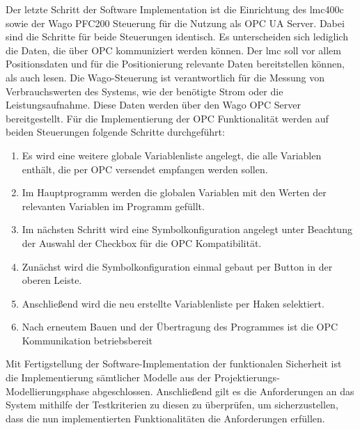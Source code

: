 \documentclass[../../../Bachelorarbeit.tex]{subfiles}
\begin{document}
Der letzte Schritt der Software Implementation ist die Einrichtung des \acs{lmc}400c sowie der Wago PFC200 Steuerung für die Nutzung als OPC UA Server. Dabei sind die Schritte für beide Steuerungen identisch. Es unterscheiden sich lediglich die Daten, die über OPC kommuniziert werden können. Der \acs{lmc} soll vor allem Positionsdaten und für die Positionierung relevante Daten bereitstellen können, als auch lesen. Die Wago-Steuerung ist verantwortlich für die Messung von Verbrauchswerten des Systems, wie der benötigte Strom oder die Leistungsaufnahme. Diese Daten werden über den Wago OPC Server bereitgestellt. Für die Implementierung der OPC Funktionalität werden auf beiden Steuerungen folgende Schritte durchgeführt:

\begin{enumerate}
    \item Es wird eine weitere globale Variablenliste angelegt, die alle Variablen enthält, die per OPC versendet \bzw empfangen werden sollen.
    \item Im Hauptprogramm werden die globalen Variablen mit den Werten der relevanten Variablen im Programm gefüllt.
    \item Im nächsten Schritt wird eine Symbolkonfiguration angelegt unter Beachtung der Auswahl der Checkbox für die OPC Kompatibilität.
    \item Zunächst wird die Symbolkonfiguration einmal gebaut per Button in der oberen Leiste.
    \item Anschließend wird die neu erstellte Variablenliste per Haken selektiert.
    \item Nach erneutem Bauen und der Übertragung des Programmes ist die OPC Kommunikation betriebsbereit
\end{enumerate}

Mit Fertigstellung der Software-Implementation der funktionalen Sicherheit ist die Implementierung sämtlicher Modelle aus der Projektierungs- \bzw Modellierungsphase abgeschlossen. Anschließend gilt es die Anforderungen an das System mithilfe der Testkriterien zu diesen zu überprüfen, um sicherzustellen, dass die nun implementierten Funktionalitäten die Anforderungen erfüllen.
\end{document}

